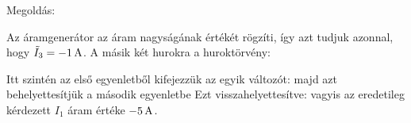 
\ifdefined\megoldas
 
 Megoldás: 

 Az áramgenerátor az áram nagyságának értékét rögzíti, így azt tudjuk azonnal, hogy $\tilde I_3=-1\mathrm{\, A}$. A másik két hurokra a huroktörvény:

 Itt szintén az első egyenletből kifejezzük az egyik változót:
 majd azt behelyettesítjük a második egyenletbe
 Ezt visszahelyettesítve:
 vagyis az eredetileg kérdezett $I_1$ áram értéke $-5\mathrm{\, A}$.

\fi
